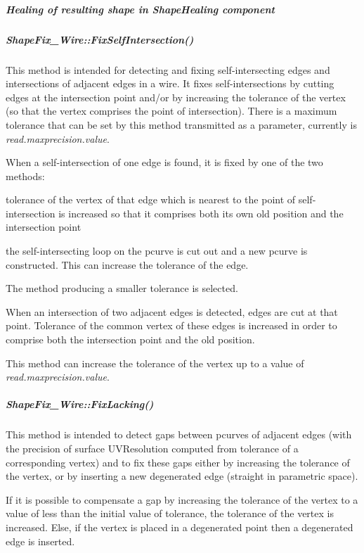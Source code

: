 \subparagraph*{Healing of resulting shape in Shape\+Healing component}

\subparagraph*{Shape\+Fix\+\_\+\+Wire\+::\+Fix\+Self\+Intersection()}

This method is intended for detecting and fixing self-\/intersecting edges and intersections of adjacent edges in a wire. It fixes self-\/intersections by cutting edges at the intersection point and/or by increasing the tolerance of the vertex (so that the vertex comprises the point of intersection). There is a maximum tolerance that can be set by this method transmitted as a parameter, currently is {\itshape read.\+maxprecision.\+value}.

When a self-\/intersection of one edge is found, it is fixed by one of the two methods\+:
\begin{DoxyItemize}
\item tolerance of the vertex of that edge which is nearest to the point of self-\/intersection is increased so that it comprises both its own old position and the intersection point
\item the self-\/intersecting loop on the pcurve is cut out and a new pcurve is constructed. This can increase the tolerance of the edge.
\end{DoxyItemize}

The method producing a smaller tolerance is selected.

When an intersection of two adjacent edges is detected, edges are cut at that point. Tolerance of the common vertex of these edges is increased in order to comprise both the intersection point and the old position.

This method can increase the tolerance of the vertex up to a value of {\itshape read.\+maxprecision.\+value}.

\subparagraph*{Shape\+Fix\+\_\+\+Wire\+::\+Fix\+Lacking()}

This method is intended to detect gaps between pcurves of adjacent edges (with the precision of surface U\+V\+Resolution computed from tolerance of a corresponding vertex) and to fix these gaps either by increasing the tolerance of the vertex, or by inserting a new degenerated edge (straight in parametric space).

If it is possible to compensate a gap by increasing the tolerance of the vertex to a value of less than the initial value of tolerance, the tolerance of the vertex is increased. Else, if the vertex is placed in a degenerated point then a degenerated edge is inserted.

